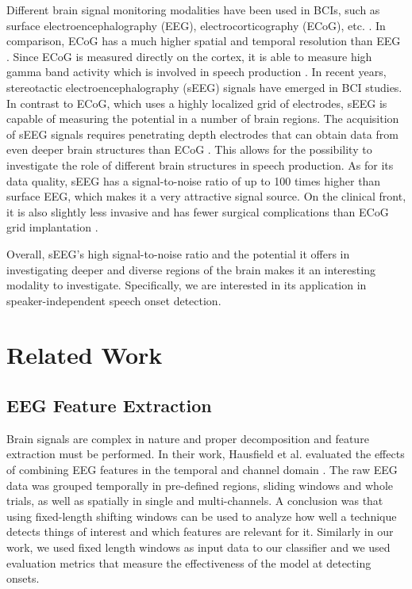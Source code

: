 \documentclass[format=sigconf, nonacm=true, review=false, screen=true]{acmart}
\begin{document}
Different brain signal monitoring modalities have been used in BCIs, such as surface electroencephalography (EEG), electrocorticography (ECoG), etc. \cite{herff2020potential}. In comparison, ECoG has a much higher spatial and temporal resolution than EEG \cite{parvizi2018promises}. Since ECoG is measured directly on the cortex, it is able to measure high gamma band activity which is involved in speech production \cite{herff2020potential}. In recent years, stereotactic electroencephalography (sEEG) signals have emerged in BCI studies. In contrast to ECoG, which uses a highly localized grid of electrodes, sEEG is capable of measuring the potential in a number of brain regions. The acquisition of sEEG signals requires penetrating depth electrodes that can obtain data from even deeper brain structures than ECoG \cite{herff2020potential}. This allows for the possibility to investigate the role of different brain structures in speech production. As for its data quality, sEEG has a signal-to-noise ratio of up to 100 times higher than surface EEG, which makes it a very attractive signal source. On the clinical front, it is also slightly less invasive and has fewer surgical complications than ECoG grid implantation \cite{herff2020potential}.

Overall, sEEG's high signal-to-noise ratio and the potential it offers in investigating deeper and diverse regions of the brain makes it an interesting modality to investigate. Specifically, we are interested in its application in speaker-independent speech onset detection.

\section{Related Work}

\subsection{EEG Feature Extraction}
Brain signals are complex in nature and proper decomposition and feature extraction must be performed. In their work, Hausfield et al. evaluated the effects of combining EEG features in the temporal and channel domain \cite{hausfeld2012pattern}. The raw EEG data was grouped temporally in pre-defined regions, sliding windows and whole trials, as well as spatially in single and multi-channels. A conclusion was that using fixed-length shifting windows can be used to analyze how well a technique detects things of interest and which features are relevant for it. Similarly in our work, we used fixed length windows as input data to our classifier and we used evaluation metrics that measure the effectiveness of the model at detecting onsets.
\end{document}

